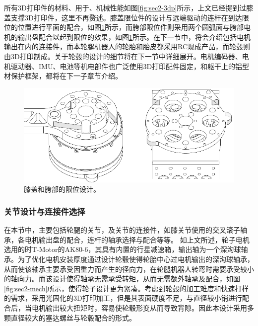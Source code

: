 所有3D打印件的材料、用于、机械性能如图\ref{fig:sec2-3dp}所示，上文已经提到过膝盖支撑3D打印件，这里不再赘述。膝盖限位件的设计与远端驱动的连杆在到达限位的位置进行平面的配合，如图\ref{fig:sec2-2lim}所示，而胯部限位件则采用两个圆弧面与胯部电机的输出盘配合以起到限位的效果，如图\ref{fig:sec2-2lim}所示。在下一节中，将会介绍包括电机输出在内的连接件，而本轮腿机器人的轮胎和胎皮都采用RC现成产品，而轮毂则由3D打印制成。关于轮毂的设计的细节将在下一节中详细展开。电机编码器、电机驱动器、IMU、电池等机电部件也广泛使用3D打印配件固定，和躯干上的铝型材保护框架，都将在下一子章节介绍。

\begin{figure}
  \centering
  \includegraphics[width=0.85\linewidth]{figures/Sec2/2lim.png}
  \caption{
  膝盖和胯部的限位设计。
  }
  \label{fig:sec2-2lim}
   \vspace{6pt}
\end{figure}

\subsubsection{关节设计与连接件选择}
在本节中，主要包括轮腿的关节，及关节的连接件，如膝关节使用的交叉滚子轴承，各电机输出盘的配合，连杆的轴承选择与配合等等。
如上文所述，轮子电机选用的时T-Motor的AK80-6，其具有内置的行星减速箱，输出轴为一个深沟球轴承。为了优化电机安装厚度通过设计轮毂使得轮胎中心过电机输出的深沟球轴承，从而使该轴承主要承受因重力而产生的径向力，在轮腿机器人转弯时需要承受较小的轴向力。而该设计使得轴承无需承受转矩，从而无需额外轴承及配合，如图\ref{fig:sec2-mech}所示，使得轮子设计更为紧凑。考虑到轮毂的加工难度和快速打样的需求，采用光固化的3D打印加工，但是其表面硬度不足，与直径较小销进行配合后，当电机输出较大扭矩时，容易使轮毂形变从而导致背隙。因此本设计采用多颗直径较大的塞达螺丝与轮毂配合的形式。

